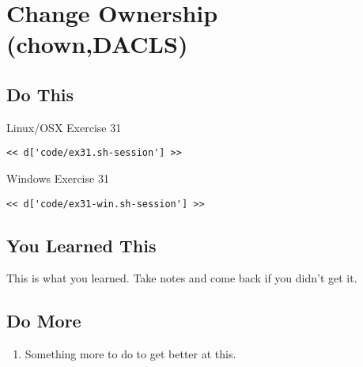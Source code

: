 \chapter{Change Ownership (chown,DACLS)}

\section{Do This}

\begin{code}{Linux/OSX Exercise 31}
\begin{Verbatim}
<< d['code/ex31.sh-session'] >>
\end{Verbatim}
\end{code}

\begin{code}{Windows Exercise 31}
\begin{Verbatim}
<< d['code/ex31-win.sh-session'] >>
\end{Verbatim}
\end{code}

\section{You Learned This}

This is what you learned.  Take notes and come back if you didn't get it.

\section{Do More}

\begin{enumerate}
\item Something more to do to get better at this.
\end{enumerate}

